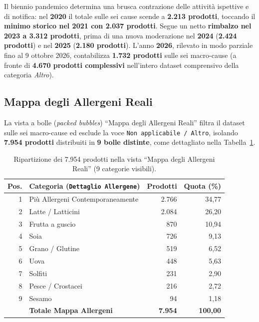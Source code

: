 Il biennio pandemico determina una brusca contrazione delle attività ispettive e di notifica: nel \textbf{2020} il totale sulle sei cause scende a \textbf{2.213 prodotti}, toccando il \textbf{minimo storico nel 2021 con 2.037 prodotti}. Segue un netto \textbf{rimbalzo nel 2023 a 3.312 prodotti}, prima di una nuova moderazione nel \textbf{2024} (\textbf{2.424 prodotti}) e nel \textbf{2025} (\textbf{2.180 prodotti}). L'anno \textbf{2026}, rilevato in modo parziale fino al 9 ottobre 2026, contabilizza \textbf{1.732 prodotti} sulle sei macro-cause (a fronte di \textbf{4.670 prodotti complessivi} nell'intero dataset comprensivo della categoria \textit{Altro}).

\subsection{Mappa degli Allergeni Reali}

La vista a bolle (\textit{packed bubbles}) ``Mappa degli Allergeni Reali'' filtra il dataset sulle sei macro-cause ed esclude la voce \texttt{Non applicabile / Altro}, isolando \textbf{7.954 prodotti} distribuiti in \textbf{9 bolle distinte}, come dettagliato nella Tabella~\ref{tab:tableau_allergens}.

\begin{table}[htbp]
\centering
\caption{Ripartizione dei 7.954 prodotti nella vista ``Mappa degli Allergeni Reali'' (9 categorie visibili).}
\label{tab:tableau_allergens}
\begin{tabularx}{\textwidth}{@{}rXrr@{}}
\toprule
\textbf{Pos.} & \textbf{Categoria (\texttt{Dettaglio Allergene})} & \textbf{Prodotti} & \textbf{Quota (\%)} \\
\midrule
1 & Più Allergeni Contemporaneamente & 2.766 & 34,77 \\
2 & Latte / Latticini & 2.084 & 26,20 \\
3 & Frutta a guscio & 870 & 10,94 \\
4 & Soia & 726 & 9,13 \\
5 & Grano / Glutine & 519 & 6,52 \\
6 & Uova & 448 & 5,63 \\
7 & Solfiti & 231 & 2,90 \\
8 & Pesce / Crostacei & 216 & 2,72 \\
9 & Sesamo & 94 & 1,18 \\
\midrule
 & \textbf{Totale Mappa Allergeni} & \textbf{7.954} & \textbf{100,00} \\
\bottomrule
\end{tabularx}
\end{table}

